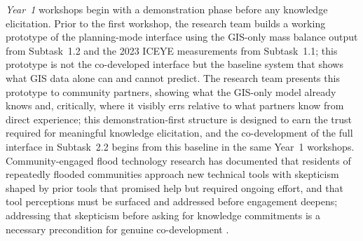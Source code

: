 \documentclass[11pt]{article}
\begin{document}
\textit{Year~1} workshops begin with a demonstration phase before any knowledge
elicitation.
Prior to the first workshop, the research team builds a working prototype of the
planning-mode interface using the GIS-only mass balance output from Subtask~1.2
and the 2023 ICEYE measurements from Subtask~1.1; this prototype is not the
co-developed interface but the baseline system that shows what GIS data alone
can and cannot predict.
The research team presents this prototype to community partners, showing what the
GIS-only model already knows and, critically, where it visibly errs relative to
what partners know from direct experience; this demonstration-first structure is
designed to earn the trust required for meaningful knowledge elicitation, and the
co-development of the full interface in Subtask~2.2 begins from this baseline
in the same Year~1 workshops.
Community-engaged flood technology research has documented that residents of
repeatedly flooded communities approach new technical tools with skepticism
shaped by prior tools that promised help but required ongoing effort, and that
tool perceptions must be surfaced and addressed before engagement deepens;
addressing that skepticism
before asking for knowledge commitments is a necessary precondition for genuine
co-development \cite{skilton2022dontwant,habib2023anchoring}.
\end{document}
